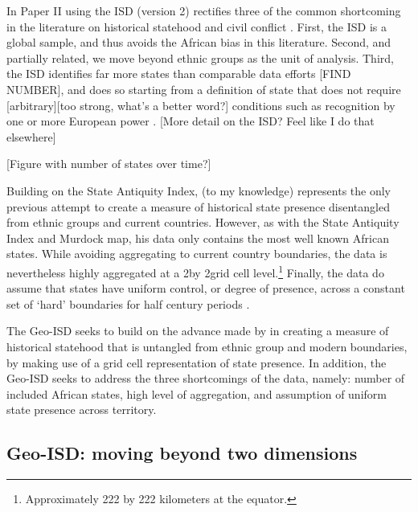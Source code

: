 In Paper II using the ISD (version 2) rectifies three of the common shortcoming in
the literature on historical statehood and civil conflict \citep{Griffiths2013}.
First, the ISD is a global sample, and thus avoids the African bias in this
literature. Second, and partially related, we move beyond ethnic groups as the
unit of analysis. Third, the ISD identifies far more states than comparable data
efforts [FIND NUMBER], and does so starting from a definition of state that does
not require [arbitrary][too strong, what's a better word?] conditions such as
recognition by one or more European power \citep{Griffiths2013}.
[More detail on the ISD? Feel like I do that elsewhere]

[Figure with number of states over time?]

Building on the State Antiquity Index, \citet{Depetris-Chauvin2016} (to my
knowledge) represents the only previous attempt to create a measure of
historical state presence disentangled from ethnic groups and current countries.
However, as with the State Antiquity Index and Murdock map, his data only
contains the most well known African states. While avoiding aggregating to
current country boundaries, the data is nevertheless highly aggregated at a
2\degree  by 2\degree  grid cell level.\footnote{Approximately 222 by 222
kilometers at the equator.} Finally, the data do assume that states have uniform
control, or degree of presence, across a constant set of `hard' boundaries for
half century periods \citep{Depetris-Chauvin2016}. 

The Geo-ISD seeks to build on the advance made by  \citet{Depetris-Chauvin2016}
in creating a measure of historical statehood that is untangled from ethnic
group and modern boundaries, by making use of a grid cell representation of
state presence. In addition, the Geo-ISD seeks to address the three shortcomings
of the data, namely: number of included African states, high level of
aggregation, and assumption of uniform state presence across territory.

\subsection{Geo-ISD: moving beyond two dimensions} 
\label{Geo-ISD}

